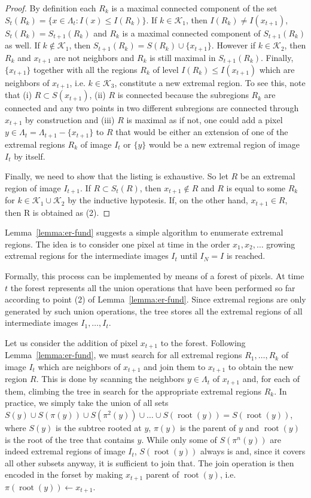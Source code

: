 \documentclass{article}
\newcommand{\rt}{\operatorname{root}}
\begin{document}
\begin{proof}
By definition each $R_k$ is a maximal connected component of the set $S_t(R_k) = \{x\in\Lambda_t : I(x) \leq I(R_k)\}$. If $k\in\mathcal{K}_1$, then $I(R_k)\not= I(x_{t+1})$, $S_t(R_k) = S_{t+1}(R_k)$ and $R_k$ is a maximal connected component of $S_{t+1}(R_k)$ as well. If $k\not\in\mathcal{K}_1$, then $S_{t+1}(R_k) = S(R_k) \cup \{x_{t+1}\}$. However if $k\in\mathcal{K}_2$, then $R_k$ and $x_{t+1}$ are not neighbors and $R_k$ is still maximal in $S_{t+1}(R_k)$. Finally, $\{x_{t+1}\}$ together with all the regions $R_k$ of level $I(R_k) \leq I(x_{t+1})$ which are neighbors of $x_{t+1}$, i.e. $k\in\mathcal{K}_3$, constitute a new extremal region. To see this, note that (i) $R\subset S(x_{t+1})$, (ii) $R$ is connected because the subregions $R_k$ are connected and any two points in two different subregions are connected through $x_{t+1}$ by construction and (iii) $R$ is maximal as if not, one could add a pixel $y \in \Lambda_t = \Lambda_{t+1} - \{x_{t+1}\}$ to $R$ that would be either an extension of one of the extremal regions $R_k$ of image $I_t$ or $\{y\}$ would be a new extremal region of image $I_t$ by itself.
	
Finally, we need to show that the listing is exhaustive. So let $R$ be an extremal region of image $I_{t+1}$. If $R \subset S_t(R)$, then $x_{t+1}\not\in R$ and $R$ is equal to some $R_k$ for $k\in\mathcal{K}_1\cup\mathcal{K}_2$ by the inductive hypotesis. If, on the other hand, $x_{t+1}\in R$, then R is obtained as (2).
\end{proof}

Lemma~\ref{lemma:er-fund} suggests a simple algorithm to enumerate extremal regions. The idea is to consider one pixel at time in the order $x_1, x_2,\dots$ growing extremal regions for the intermediate images $I_t$ until $I_N=I$ is reached.

Formally, this process can be implemented by means of a forest of pixels. At time $t$ the forest represents all the union operations that have been performed so far according to point (2) of Lemma~\ref{lemma:er-fund}. Since extremal regions are only generated by such union operations, the tree stores all the extremal regions of all intermediate images $I_1,\dots,I_t$. 

Let us consider the addition of pixel $x_{t+1}$ to the forest. Following Lemma~\ref{lemma:er-fund}, we must search for all extremal regions $R_1,\dots,R_k$ of image $I_t$ which are neighbors of $x_{t+1}$ and join them to $x_{t+1}$ to obtain the new region $R$. This is done by scanning the neighbors $y\in\Lambda_{t}$ of $x_{t+1}$ and, for each of them, climbing the tree in search for the appropriate extremal regions $R_k$. In practice, we simply take the union of all sets $S(y) \cup S(\pi(y)) \cup S(\pi^2(y)) \cup \dots \cup S(\rt(y)) = S(\rt(y))$, where $S(y)$ is the subtree rooted at $y$, $\pi(y)$ is the parent of $y$ and $\rt(y)$ is the root of the tree that contains $y$. While only some of $S(\pi^n(y))$ are indeed extremal regions of image $I_t$, $S(\rt(y))$ always is and, since it covers all other subsets anyway, it is sufficient to join that.  The join operation is then encoded in the forset by making $x_{t+1}$ parent of $\rt(y)$, i.e. $\pi(\rt(y)) \leftarrow x_{t+1}$.
\end{document}
